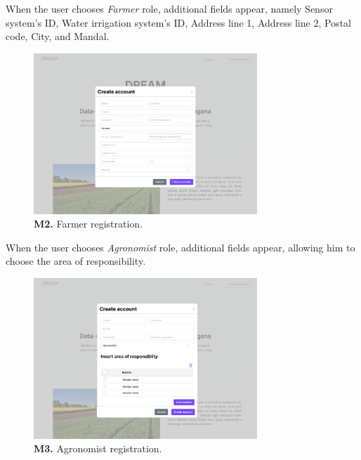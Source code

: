     When the user chooses \textit{Farmer} role, additional fields appear, namely Sensor system's ID, Water irrigation system's ID, Address line 1, Address line 2, Postal code, City, and Mandal.
    \begin{figure}[H]
        \centering
        \includegraphics[width=0.75\textwidth]{mockups/Unreg. user_Create account_Farmer.png}
        \caption{\textbf{M2.} Farmer registration.}
        \label{fig:farmer-create-account}
    \end{figure}
    
    When the user chooses \textit{Agronomist} role, additional fields appear, allowing him to choose the area of responsibility.
    \begin{figure}[H]
        \centering
        \includegraphics[width=0.75\textwidth]{mockups/Unreg. user_Create account_Agronomist.png}
        \caption{\textbf{M3.} Agronomist registration.}
        \label{fig:agronomist-create-account}
    \end{figure}
    
